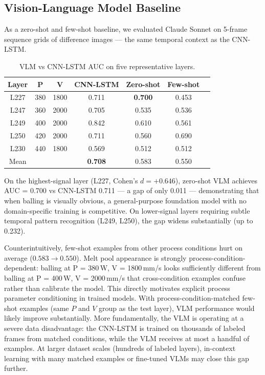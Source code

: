 \documentclass[12pt, letterpaper]{article}
\begin{document}
\subsection{Vision-Language Model Baseline}

As a zero-shot and few-shot baseline, we evaluated Claude
Sonnet on 5-frame sequence grids of difference images —
the same temporal context as the CNN-LSTM.

\begin{table}[H]
\centering
\caption{VLM vs CNN-LSTM AUC on five representative layers.}
\begin{tabular}{ccccccc}
\toprule
Layer & P & V & CNN-LSTM & Zero-shot & Few-shot \\
\midrule
L227 & 380 & 1800 & 0.711 & \textbf{0.700} & 0.453 \\
L247 & 360 & 2000 & 0.705 & 0.535 & 0.536 \\
L249 & 400 & 2000 & 0.842 & 0.610 & 0.561 \\
L250 & 420 & 2000 & 0.711 & 0.560 & 0.690 \\
L230 & 440 & 1800 & 0.569 & 0.512 & 0.512 \\
\midrule
Mean & & & \textbf{0.708} & 0.583 & 0.550 \\
\bottomrule
\end{tabular}
\end{table}

On the highest-signal layer (L227, Cohen's $d = +0.646$),
zero-shot VLM achieves AUC = 0.700 vs CNN-LSTM 0.711 — a
gap of only 0.011 — demonstrating that when balling is
visually obvious, a general-purpose foundation model with
no domain-specific training is competitive. On lower-signal
layers requiring subtle temporal pattern recognition (L249,
L250), the gap widens substantially (up to 0.232).

Counterintuitively, few-shot examples from other process
conditions hurt on average ($0.583 \to 0.550$). Melt pool
appearance is strongly process-condition-dependent: balling
at P = 380\,W, V = 1800\,mm/s looks sufficiently different
from balling at P = 400\,W, V = 2000\,mm/s that cross-condition
examples confuse rather than calibrate the model. This directly
motivates explicit process parameter conditioning in trained
models. With process-condition-matched few-shot examples (same
$P$ and $V$ group as the test layer), VLM performance would
likely improve substantially. More fundamentally, the VLM
is operating at a severe data disadvantage: the CNN-LSTM
is trained on thousands of labeled frames from matched
conditions, while the VLM receives at most a handful of
examples. At larger dataset scales (hundreds of labeled
layers), in-context learning with many matched examples
or fine-tuned VLMs may close this gap further.
\end{document}
